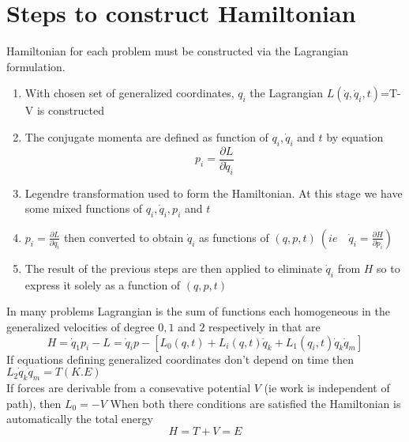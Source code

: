 \section{Steps to construct Hamiltonian}
Hamiltonian for each problem must be constructed via the Lagrangian formulation.
\begin{enumerate}
	\item With chosen set of generalized coordinates, $q_i$ the Lagrangian $L(\dot{q},\dot{q}_i,t)$=T-V is constructed
	\item The conjugate momenta are defined as function of $q_i,\dot{q}_i$ and $t$ by equation
	$$p_i=\frac{\partial L}{\partial \dot{q}_i}$$
	\item Legendre transformation used to form the Hamiltonian. At this stage we have some mixed functions of $q_i,\dot{q}_i,p_i$ and $t$
	\item $p_i=\frac{\partial L}{\partial \dot{q}_i}$ then converted to obtain $\dot{q}_i$ as functions of $(q,p,t)\ (ie\quad \dot{q}_i=\frac{\partial H}{\partial p_i})$
	\item The result of the previous steps are then applied to eliminate $\dot{q}_i$ from $H$ so to express it solely as a function of $(q,p,t)$
\end{enumerate}
\begin{note}
	In many problems Lagrangian is the sum of functions each homogeneous in the generalized velocities of degree $0,1$ and $2$ respectively in that are
	$$ H=\dot{q}_1p_i-L=\dot{q}_ip-[L_0(q,t)+L_i(q,t)\dot{q}_k+L_1(q_i,t)\dot{q}_k\dot{q}_m]$$
	If equations defining generalized coordinates don't depend on time then $L_2 \dot{q}_k\dot{q}_m=T(K.E)$\\
	If forces are derivable from a consevative potential $V$ (ie work is independent of path), then $L_0=-V$
	When both there conditions are satisfied the Hamiltonian is automatically the total energy
	$$H=T+V=
	E$$
\end{note}
